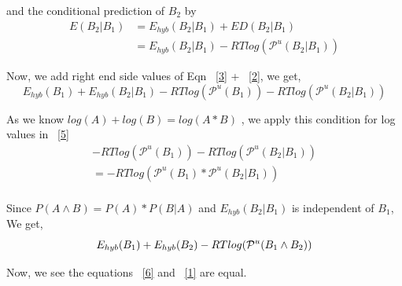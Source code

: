 \documentclass[twoside,a4paper]{report}
\numberwithin{equation}{section}
\begin{document}
	and the conditional prediction of $B_2$ by\\
	
	\begin{align}
	E(B_2 | B_1) &= E_{hyb}( B_2 | B_1 )+ ED(B_2 | B_1)\nonumber \\
	& = E_{hyb}(B_2 | B_1) - RTlog(\mathcal{P}^u(B_2 | B_1)) \label{3}
	\end{align}

Now, we add right end side values of Eqn ~\ref{3} + ~\ref{2}, we get,\\
	\begin{equation}
	\label{5}
	 E_{hyb}(B_1) + E_{hyb}(B_2 | B_1) - RTlog(\mathcal{P}^u(B_1)) - RTlog(\mathcal{P}^u(B_2 | B_1))
	\end{equation}
	 
	As we know $log (A) + log (B) = log( A * B)$ , we apply this condition for log values in ~\ref{5}\\
	
	\begin{align*}
		-RTlog(\mathcal{P}^u(B_1)) - RTlog(\mathcal{P}^u(B_2 | B_1))\\
	=	-RTlog(\mathcal{P}^u(B_1) * \mathcal{P}^u(B_2 | B_1))\\
	\end{align*}
	
	Since $P(A \land B) = P(A) * P(B |A)$ and $E_{hyb}(B_2 | B_1)$ is independent of $B_1$, We get,\\
	
%
% 	
 	\begin{equation}
 	\label{6}
 	E_{hyb}(B_1) + E_{hyb}(B_2) - RTlog(\mathcal{P}^u(B_1 \land B_2))\\
 	\end{equation}
	
	Now,  we see the equations ~\ref{6} and ~\ref{1} are equal. \\
	
	
%	
%	
\end{document}
